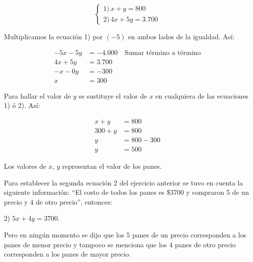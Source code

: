 \documentclass[12pt,a4paper]{article}
\begin{document}
\begin{tcolorbox}[colback=fondoverde,colframe=verdeclaro,title=Método de Eliminación]

\[ \begin{cases}
1) \, x + y = 800 \\
2) \, 4x + 5y = 3.700
\end{cases} \]

Multiplicamos la ecuación 1) por $(-5)$ en ambos lados de la igualdad. Así:

\begin{align*}
-5x - 5y &= -4.000 \quad \text{Sumar término a término} \\
4x + 5y &= 3.700 \\
\hline
-x - 0y &= -300 \\
x &= 300
\end{align*}

Para hallar el valor de $y$ se sustituye el valor de $x$ en cualquiera de las ecuaciones 1) ó 2). Así:

\begin{align*}
x + y &= 800 \\
300 + y &= 800 \\
y &= 800 - 300 \\
y &= 500
\end{align*}

Los valores de $x$, $y$ representan el valor de los panes.

\end{tcolorbox}

\vspace{1cm}

\begin{tcolorbox}[colback=fondorosa,colframe=rojoclaro,title=Reflexiona un momento]

Para establecer la segunda ecuación 2 del ejercicio anterior se tuvo en cuenta la siguiente información: ``El costo de todos los panes es \$3700 y compraron 5 de un precio y 4 de otro precio'', entonces:

2) $5x + 4y = 3700$.

Pero en ningún momento se dijo que los 5 panes de un precio corresponden a los panes de menor precio y tampoco se menciona que los 4 panes de otro precio corresponden a los panes de mayor precio.

\end{tcolorbox}
\end{document}
